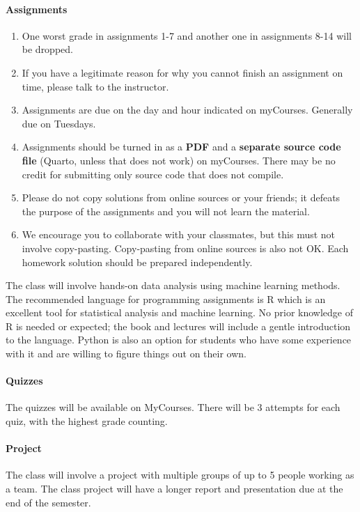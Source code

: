 \documentclass[11pt]{article}
\begin{document}
\paragraph{Assignments}
\begin{enumerate}[nosep]
    \item One worst grade in assignments 1-7 and another one in assignments 8-14 will be dropped.
    \item If you have a legitimate reason for why you cannot finish an assignment on time, please talk to the instructor.
    \item Assignments are due on the day and hour indicated on myCourses. Generally due on Tuesdays.
    \item Assignments should be turned in as a \textbf{PDF} and a \textbf{separate source code file} (Quarto, unless that does not work) on myCourses. There may be no credit for submitting only source code that does not compile.
    \item Please do not copy solutions from online sources or your friends; it defeats the purpose of the assignments and you will not learn the material.
    \item We encourage you to collaborate with your classmates, but this must not involve copy-pasting. Copy-pasting from online sources is also not OK. Each homework solution should be prepared independently.
\end{enumerate}

The class will involve hands-on data analysis using machine learning methods. The recommended language for programming assignments is R which is an excellent tool for statistical analysis and machine learning. No prior knowledge of R is needed or expected; the book and lectures will include a gentle introduction to the language. Python is also an option for students who have some experience with it and are willing to figure things out on their own.

\paragraph{Quizzes} The quizzes will be available on MyCourses. There will be 3 attempts for each quiz, with the highest grade counting. 


\paragraph{Project} The class will involve a project with multiple groups of up to 5 people working as a team. The class project will have a longer report and presentation due at the end of the semester.
\end{document}
